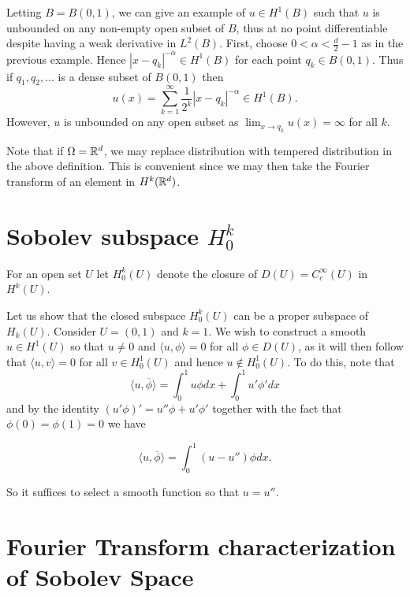 \documentclass[twoside, a4paper, 10pt]{amsart}
\begin{document}
\begin{eg} Letting $B = B(0,1)$,  we can give an example of $u \in H^1(B)$ such that $u$ is unbounded on any non-empty open subset of $B$, thus at no point differentiable despite having a weak derivative in $L^2(B)$. First, choose $0<\alpha < \frac{d}{2} - 1$ as in the previous example. Hence $|x - q_k|^{-\alpha} \in H^1(B)$ for each point $q_k \in B(0,1)$. Thus if $q_1, q_2, \ldots$ is a dense subset of $B(0,1)$ then $$u(x) = \sum_{k=1}^{\infty} \frac{1}{2^k} |x - q_k|^{-\alpha} \in H^1(B).$$ However, $u$ is unbounded on any open subset as $\lim_{x \to q_k} u(x) = \infty$ for all $k$.

\end{eg}

Note that if $\Omega = \mathbb{R}^d$, we may replace distribution with tempered distribution in the above definition. This is convenient since we may then take the Fourier transform of an element in $H^k(\mathbb{R}^d)$. 

\section{Sobolev subspace $H_0^k$}

\begin{mydef} For an open set $U$ let $H_0^k(U)$ denote the closure of $D(U) = C_c^{\infty}(U)$ in $H^k(U)$.

\end{mydef}

\begin{eg} Let us show that the closed subspace $H_0^k(U)$ can be a proper subspace of $H_k(U)$. Consider $U = (0,1)$ and $k=1$. We wish to construct a smooth $u \in H^1(U)$ so that $u \neq 0$ and $\langle u, \phi \rangle =0$ for all $\phi \in D(U)$, as it will then follow that $\langle u, v \rangle = 0$ for all $v \in H_0^1(U)$ and hence $u \notin H_0^1(U)$. To do this, note that $$\langle u, \overline{\phi} \rangle = \int_0^1 u\phi dx + \int_0^1 u' \phi' dx$$ and by the identity $(u'\phi)' = u''\phi + u' \phi'$ together with the fact that $\phi(0) = \phi(1) = 0$  we have 

$$ \langle u, \overline{\phi} \rangle = \int_0^1 (u - u'') \phi dx.$$

So it suffices to select a smooth function so that $u = u''$. 
\end{eg}


\section{Fourier Transform characterization of Sobolev Space}
\end{document}
